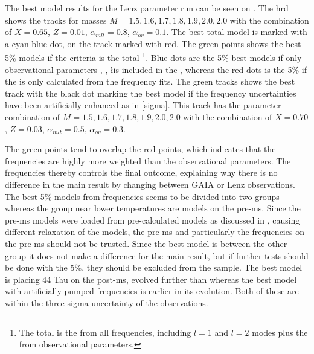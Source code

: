The best model results for the Lenz parameter run can be seen on . The hrd shows the tracks for masses $M = 1.5,1.6,1.7,1.8,1.9,2.0,2.0$ with the combination of $X=0.65 $, $Z= 0.01$, $\alpha_{mlt} = 0.8$, $\alpha_{ov} = 0.1$. The best total model is marked with a cyan blue dot, on the track marked with red. The green points shows the best 5\% models if the criteria is the total \chis\footnote{The total \chis is the \chis from all frequencies, including $l=1$ and $l=2$ modes plus the \chis from observational parameters.}. Blue dots are the 5\% best models if only observational parameters \logg, \teff, \l is included in the \chis, whereas the red dots is the 5\% if the \chis is only calculated from the frequency fits. The green tracks shows the best track with the black dot marking the best model if the frequency uncertainties have been artificially enhanced as in \eqref{sigma}. This track has the parameter combination of $M = 1.5,1.6,1.7,1.8,1.9,2.0,2.0$ with the combination of $X = 0.70$, $Z=0.03$, $\alpha_{mlt}=0.5$, $\alpha_{ov}=0.3$. 
\begin{figure}[htbp]
	\centering
	\caption{}
	\label{hrd44taulenz}
\end{figure}
The green points tend to overlap the red points, which indicates that the frequencies are highly more weighted than the observational parameters. The frequencies thereby controls the final outcome, explaining why there is no difference in the main result by changing between GAIA or Lenz observations. The best 5\% models from frequencies seems to be divided into two groups whereas the group near lower temperatures are models on the pre-ms. Since the pre-ms models were loaded from pre-calculated models as discussed in , causing different relaxation of the models, the pre-ms and particularly the frequencies on the pre-ms should not be trusted. Since the best model is between the other group it does not make a difference for the main result, but if further tests should be done with the 5\%, they should be excluded from the sample. The best model is placing 44 Tau on the post-ms, evolved further than \citet{lenz2010delta} whereas the best model with artificially pumped frequencies is earlier in its evolution. Both of these are within the three-sigma uncertainty of the observations. 

